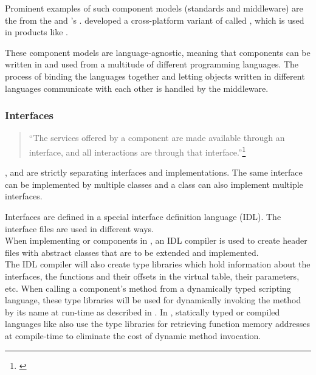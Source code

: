 Prominent examples of such component models (standards and middleware) \linebreak are the  \linebreak from the   and 's \linebreak{}.  developed a cross-platform variant of  called , which is used in products like .

These component models are language-agnostic, meaning that components can be written in and used from a multitude of different programming languages. The process of binding the languages together and letting objects written in different languages communicate with each other is handled by the middleware.

\subsubsection{Interfaces}

\begin{quotation}
``The services offered by a component are made available through an interface, and all interactions are through that interface.''\footnote{\citep[444]{Sommerville}}
\end{quotation}

,  and  are strictly separating interfaces and implementations. The same interface can be implemented by multiple classes and a class can also implement multiple interfaces.

Interfaces are defined in a special interface definition language (IDL). The interface files are used in different ways.\\
When implementing  or  components in , an IDL compiler is used to create header files with abstract classes that are to be extended and implemented.\\
The IDL compiler will also create type libraries which hold information about the interfaces, the functions and their offsets in the virtual table, their parameters, etc. When calling a component's method from a dynamically typed scripting language, these type libraries will be used for dynamically invoking the method by its name at run-time as described in . In , statically typed or compiled languages like  also use the type libraries for retrieving function memory addresses at compile-time to eliminate the cost of dynamic method invocation.  

